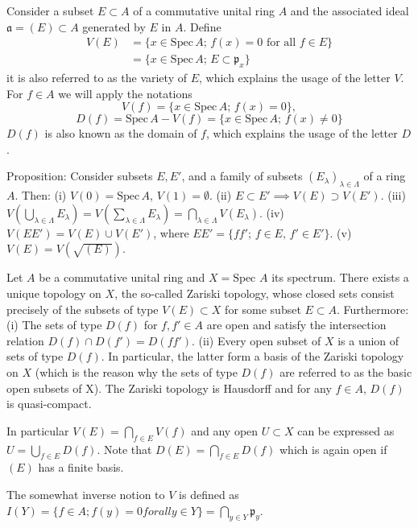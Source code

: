 Consider a subset \( E \subset A \) of a commutative unital ring \( A \) 
and the associated ideal \( \mathfrak{a} = (E) \subset A \) generated by \( E \) in \( A \). 
Define
\[
\begin{aligned}
V(E) &= \{ x \in \mathrm{Spec}\, A ;\, f(x) = 0 \text{ for all } f \in E \} \\
     &= \{ x \in \mathrm{Spec}\, A ;\, E \subset \mathfrak{p}_x \}
\end{aligned}
\]
it is also referred to as the variety of \( E \), which explains the usage of the letter \( V \). 
For \( f \in A \) we will apply the notations
\[
V(f) = \{ x \in \mathrm{Spec}\, A ;\, f(x) = 0 \},
\]
\[
D(f) = \mathrm{Spec}\, A - V(f) = \{ x \in \mathrm{Spec}\, A ;\, f(x) \ne 0 \}
\]
\( D(f) \) is also known as the domain of \( f \), which explains the usage of the letter \( D \). 

Proposition:
Consider subsets \( E, E' \), and a family of subsets \( (E_\lambda)_{\lambda \in \Lambda} \) of a ring \( A \). Then:
(i) \( V(0) = \mathrm{Spec}\, A \), \( V(1) = \emptyset \).
(ii) \( E \subset E' \implies V(E) \supset V(E') \).
(iii) \( V \left( \bigcup_{\lambda \in \Lambda} E_\lambda \right) = V \left( \sum_{\lambda \in \Lambda} E_\lambda \right) = \bigcap_{\lambda \in \Lambda} V(E_\lambda) \).
(iv) \( V(E E') = V(E) \cup V(E') \), where \( E E' = \{ f f' ;\, f \in E,\, f' \in E' \} \).
(v) \( V(E) = V(\sqrt{(E)}) \).

Let \( A \) be a commutative unital ring and \( X = \text{Spec } A \) its spectrum. There exists a
unique topology on \( X \), the so-called Zariski topology, whose closed sets consist
precisely of the subsets of type \( V(E) \subset X \) for some subset \( E \subset A \).
Furthermore:
(i) The sets of type \( D(f) \) for \( f, f' \in A \) are open and satisfy the intersection
relation \( D(f) \cap D(f') = D(f f') \).
(ii) Every open subset of \( X \) is a union of sets of type \( D(f) \). In particular,
the latter form a basis of the Zariski topology on \( X \) (which is the reason why
the sets of type \( D(f) \) are referred to as the basic open subsets of X).
The Zariski topology is Hausdorff and for any \( f \in A \), \( D(f) \) is quasi-compact.

In particular \( V(E) = \bigcap_{f \in E} V(f) \) and any open \( U \subset X \) can be expressed as \( U = \bigcup_{f \in E} D(f) \).
Note that \( D(E) = \bigcap_{f \in E} D(f) \) which is again open if \( (E) \) has a finite basis.

The somewhat inverse notion to \( V \) is defined as 
\( I(Y) = \{ f \in A ; f(y) = 0 for all y \in Y \} = \bigcap_{y \in Y} \mathfrak{p}_y \).

